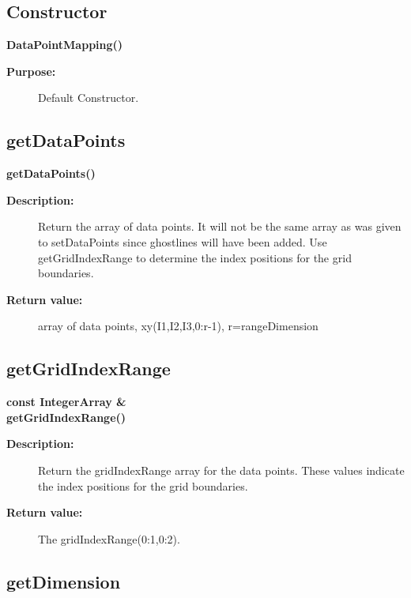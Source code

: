\subsection{Constructor}
 
\newlength{\DataPointMappingIncludeArgIndent}
\begin{flushleft} \textbf{%
\settowidth{\DataPointMappingIncludeArgIndent}{DataPointMapping(}%
DataPointMapping() 
}\end{flushleft}
\begin{description}
\item[{\bf Purpose:}]  Default Constructor. 
\end{description}
\subsection{getDataPoints}
 
\begin{flushleft} \textbf{%
\settowidth{\DataPointMappingIncludeArgIndent}{getDataPoints(}%
getDataPoints()
}\end{flushleft}
\begin{description}
\item[{\bf Description:}] 
  Return the array of data points. It will not be the same array as was given to
    setDataPoints since ghostlines will have been added. Use getGridIndexRange
    to determine the index positions for the grid boundaries.
\item[{\bf Return value:}]  array of data points, xy(I1,I2,I3,0:r-1), r=rangeDimension
\end{description}
\subsection{getGridIndexRange}
 
\begin{flushleft} \textbf{%
const IntegerArray \&  \\ 
\settowidth{\DataPointMappingIncludeArgIndent}{getGridIndexRange(}%
getGridIndexRange()
}\end{flushleft}
\begin{description}
\item[{\bf Description:}] 
  Return the gridIndexRange array for the data points. These values indicate
  the index positions for the grid boundaries.
\item[{\bf Return value:}]  The gridIndexRange(0:1,0:2).
\end{description}
\subsection{getDimension}
 
